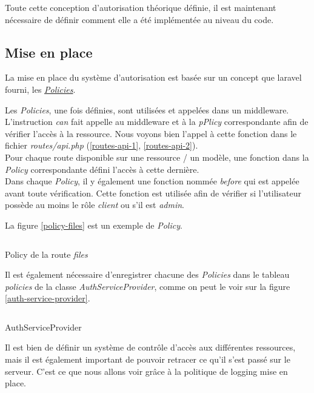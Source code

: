 \documentclass[
    iai, %
    il, %
]{heig-tb}
\begin{document}
Toute cette conception d'autorisation théorique définie, il est maintenant nécessaire de définir comment elle a été implémentée au niveau du code.

\subsection{Mise en place}
La mise en place du système d'autorisation est basée sur un concept que \Gls{laravel} fourni, les \href{https://laravel.com/docs/9.x/authorization#creating-policies}{\emph{Policies}}.

Les \emph{Policies}, une fois définies, sont utilisées et appelées dans un middleware. L'instruction \emph{can} fait appelle au middleware et à la \emph{pPlicy} correspondante afin de vérifier l'accès à la ressource. Nous voyons bien l'appel à cette fonction dans le fichier \emph{routes/api.php} (\ref{routes-api-1}, \ref{routes-api-2}). \\
Pour chaque route disponible sur une ressource / un modèle, une fonction dans la \emph{Policy} correspondante défini l'accès à cette dernière. \\
Dans chaque \emph{Policy}, il y également une fonction nommée \emph{before} qui est appelée avant toute vérification. Cette fonction est utilisée afin de vérifier si l'utilisateur possède au moins le rôle \emph{client} ou s'il est \emph{admin}.

La figure \ref{policy-files} est un exemple de \emph{Policy}.

\begin{listing}[H]
    \inputminted{php}{assets/code/FilePolicy.php}
    \caption{Policy de la route \emph{files} \label{policy-files}}
\end{listing}

Il est également nécessaire d'enregistrer chacune des \emph{Policies} dans le tableau \emph{policies} de la classe \emph{AuthServiceProvider}, comme on peut le voir sur la figure \ref{auth-service-provider}.

\begin{listing}[H]
    \inputminted{php}{assets/code/AuthServiceProvider.php}
    \caption{AuthServiceProvider \label{auth-service-provider}}
\end{listing}

Il est bien de définir un système de contrôle d'accès aux différentes ressources, mais il est également important de pouvoir retracer ce qu'il s'est passé sur le serveur. C'est ce que nous allons voir grâce à la politique de logging mise en place.
\end{document}
